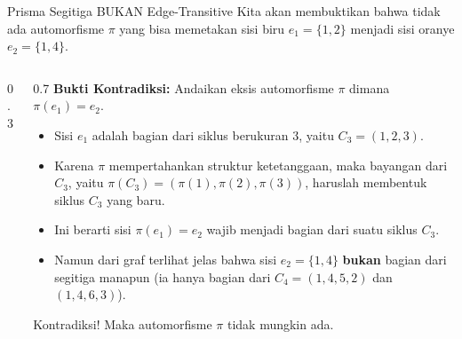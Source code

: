 \documentclass[aspectratio=169]{beamer}
\begin{document}
\begin{frame}[fragile]{Prisma Segitiga BUKAN Edge-Transitive}
  Kita akan membuktikan bahwa tidak ada automorfisme $\pi$ yang bisa memetakan sisi biru $e_1 = \{1, 2\}$ menjadi sisi oranye $e_2 = \{1, 4\}$.

  \begin{columns}
    \begin{column}{0.3\textwidth}
    \end{column}

    \begin{column}{0.7\textwidth}
      \textbf{Bukti Kontradiksi:}
      Andaikan eksis automorfisme $\pi$ dimana $\pi(e_1) = e_2$.
      \begin{itemize}
        \item Sisi $e_1$ adalah bagian dari siklus berukuran 3, yaitu $C_3 = (1, 2, 3)$.
        \item Karena $\pi$ mempertahankan struktur ketetanggaan, maka bayangan dari $C_3$, yaitu $\pi(C_3) = (\pi(1), \pi(2), \pi(3))$, haruslah membentuk siklus $C_3$ yang baru.
        \item Ini berarti sisi $\pi(e_1) = e_2$ wajib menjadi bagian dari suatu siklus $C_3$.
        \item Namun dari graf terlihat jelas bahwa sisi $e_2 = \{1, 4\}$ \textbf{bukan} bagian dari segitiga manapun (ia hanya bagian dari $C_4 = (1,4,5,2)$ dan $(1,4,6,3)$).
      \end{itemize}
      Kontradiksi! Maka automorfisme $\pi$ tidak mungkin ada.
    \end{column}
  \end{columns}
\end{frame}
\end{document}
